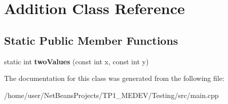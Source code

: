 \hypertarget{classAddition}{\section{Addition Class Reference}
\label{classAddition}
}
\subsection*{Static Public Member Functions}
\begin{DoxyCompactItemize}
\item 
\hypertarget{classAddition_a15d3907d8c9e9d150f89e6be205f3208}{static int {\bfseries two\+Values} (const int x, const int y)}\label{classAddition_a15d3907d8c9e9d150f89e6be205f3208}

\end{DoxyCompactItemize}


The documentation for this class was generated from the following file\+:\begin{DoxyCompactItemize}
\item 
/home/user/\+Net\+Beans\+Projects/\+T\+P1\+\_\+\+M\+E\+D\+E\+V/\+Testing/src/main.\+cpp\end{DoxyCompactItemize}
